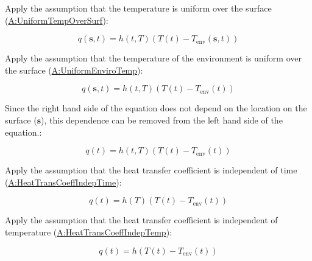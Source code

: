 \documentclass[12pt]{article}
\begin{document}
\noindent Apply the assumption that the temperature is uniform
over the surface (\hyperref[assumpUnifTempSurf]{A:UniformTempOverSurf}):

\begin{displaymath} 
        q(\textbf{s}, t) = h(t, T) (T(t) - T_{\text{env}}(\textbf{s}, t))
\end{displaymath}

\noindent Apply the assumption that the temperature of the environment is uniform
over the surface (\hyperref[assumpUnifEnviroTempSurf]{A:UniformEnviroTemp}):

\begin{displaymath} 
        q(\textbf{s}, t) = h(t, T) (T(t) - T_{\text{env}}(t))
\end{displaymath}

\noindent Since the right hand side of the equation does not depend on the
location on the surface ($\textbf{s}$), this dependence can be removed from the
left hand side of the equation.:

\begin{displaymath} 
        q(t) = h(t, T) (T(t) - T_{\text{env}}(t))
\end{displaymath}

\noindent Apply the assumption that the heat transfer coefficient is independent of time (\hyperref[assumpHeatTransIndepTime]{A:HeatTransCoeffIndepTime}):

\begin{displaymath} 
        q(t) = h(T) (T(t) - T_{\text{env}}(t))
\end{displaymath}

\noindent Apply the assumption that the heat transfer coefficient is independent of temperature (\hyperref[assumpHeatTransIndepTemp]{A:HeatTransCoeffIndepTemp}):

\begin{displaymath} 
        q(t) = h (T(t) - T_{\text{env}}(t))
\end{displaymath}

\end{document}
